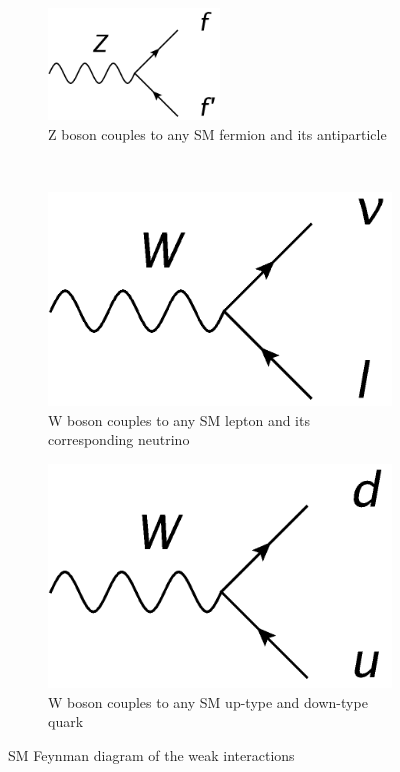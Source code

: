 \begin{minipage}{0.4\textwidth}
\centering
\begin{figure}[H]
\centering
\begin{subfigure}[b]{\textwidth}\centering
\includegraphics[width=0.5\textwidth]{Feynman_diagrams/Jaxo_weak_Z.png}
\caption{Z boson couples to any SM fermion and its antiparticle}
\end{subfigure}\\
\begin{subfigure}[t]{0.48\textwidth}\centering
\includegraphics[width=\textwidth]{Feynman_diagrams/Jaxo_weak_W_leptons.png}
\caption{W boson couples to any SM lepton and its corresponding neutrino}
\end{subfigure}\hfill
\begin{subfigure}[t]{0.48\textwidth}\centering
\includegraphics[width=\textwidth]{Feynman_diagrams/Jaxo_weak_W_quarks.png}
\caption{W boson couples to any SM up-type and down-type quark}
\end{subfigure}
\caption{SM Feynman diagram of the weak interactions}
\label{fig:Feynman:weak} 
\end{figure}
\end{minipage}

